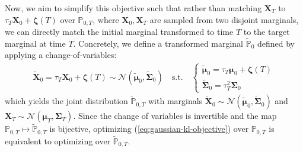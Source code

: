 \documentclass{article}
\begin{document}
Now, we aim to simplify this objective such that rather than matching $\boldsymbol{X}_T$ to $\tau_T\boldsymbol{X}_0+\boldsymbol{\zeta}(T)$ over $\mathbb{P}_{0,T}$, where $\boldsymbol{X}_0, \boldsymbol{X}_T$ are sampled from two disjoint marginals, we can directly match the initial marginal transformed to time $T$ to the target marginal at time $T$. Concretely, we define a transformed marginal $\tilde{\mathbb{P}}_0$ defined by applying a change-of-variables:
\begin{align}
    \tilde{\boldsymbol{X}}_0=\tau_T\boldsymbol{X}_0+\boldsymbol{\zeta}(T)\sim \mathcal{N}(\tilde{\boldsymbol{\mu}}_0, \tilde{\boldsymbol{\Sigma}}_0)\quad \text{s.t.}\quad \begin{cases}
        \tilde{\boldsymbol{\mu}}_0=\tau_T\boldsymbol{\mu}_0+\boldsymbol{\zeta}(T)\\
        \tilde{\boldsymbol{\Sigma}}_0=\tau_T^2\boldsymbol{\Sigma}_0
    \end{cases}\label{eq:change-of-var-gsb}
\end{align}
which yields the joint distribution $\tilde{\mathbb{P}}_{0,T}$ with marginals $\tilde{\boldsymbol{X}}_0\sim\mathcal{N}(\tilde{\boldsymbol{\mu}}_0, \tilde{\boldsymbol{\Sigma}}_0)$ and $\boldsymbol{X}_T\sim \mathcal{N}(\boldsymbol{\mu}_T, \boldsymbol{\Sigma}_T)$. Since the change of variables is invertible and the map $\mathbb{P}_{0,T}\mapsto\tilde{\mathbb{P}}_{0,T}$ is bijective, optimizing (\ref{eq:gaussian-kl-objective}) over $\mathbb{P}_{0,T}$ is equivalent to optimizing over $\tilde{\mathbb{P}}_{0,T}$.
\end{document}
